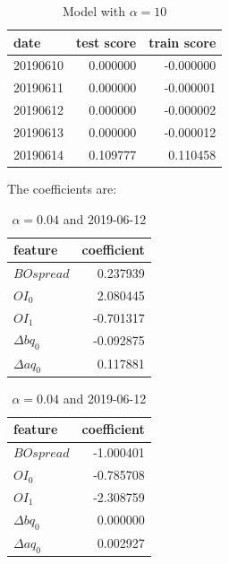 \documentclass[english, 11pt, a4paper]{article}
\begin{document}
\begin{table}[H]
    \centering
    \begin{tabular}{lrr}
    \toprule
    date & test score & train score \\
    \midrule
    20190610 & 0.000000 & -0.000000 \\
    20190611 & 0.000000 & -0.000001 \\
    20190612 & 0.000000 & -0.000002 \\
    20190613 & 0.000000 & -0.000012 \\
    20190614 & 0.109777 & 0.110458 \\
    \bottomrule
    \end{tabular}
    \caption{Model with $\alpha = 10$}
\end{table}

The coefficients are:


\begin{table}[H]
  \centering
  \begin{minipage}{.4\textwidth}
    \centering
      \begin{tabular}{lr}
      \toprule
      feature & coefficient \\
      \midrule
      $BOspread$ & 0.237939 \\
      $OI_0$ & 2.080445 \\
      $OI_1$ & -0.701317 \\
      $\Delta bq_{0}$ & -0.092875 \\
      $\Delta aq_{0}$ & 0.117881 \\
      \bottomrule
      \end{tabular}
  \caption{ $\alpha = 0.04$ and 2019-06-10}
  \end{minipage}
  \begin{minipage}{.4\textwidth}
    \centering
  \begin{tabular}{lr}
  \toprule
  feature & coefficient \\
  \midrule
  $BOspread$ & -1.000401 \\
  $OI_0$ & -0.785708 \\
  $OI_1$ & -2.308759 \\
  $\Delta bq_{0}$ & 0.000000 \\
  $\Delta aq_{0}$ & 0.002927 \\
  \bottomrule
  \end{tabular}
  \caption{ $\alpha = 0.04$ and 2019-06-12}
  \end{minipage}
\end{table}
\end{document}
